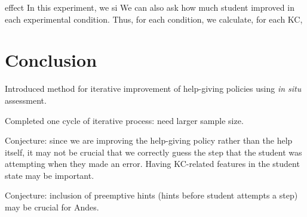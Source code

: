 \documentclass{edm_template}
\begin{document}
effect 
In this experiment, we si
We can also ask how much student improved in each experimental condition.
Thus, for each condition, we calculate, for each KC, 

\section{Conclusion}

Introduced method for iterative improvement of help-giving policies using 
{\em in situ} assessment.

Completed one cycle of iterative process:  need larger sample size.

Conjecture:  since we are improving the help-giving policy rather than the
help itself, it may not be crucial that we correctly guess the step
that the student was attempting when they made an error.  Having
KC-related features in the student state may be important.

Conjecture: inclusion of preemptive hints (hints before student attempts
a step) may be crucial for Andes. 

% 


\end{document}
